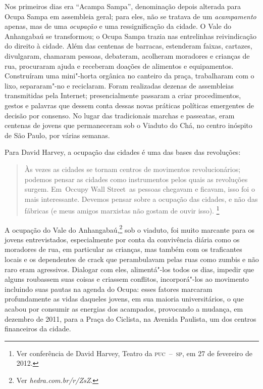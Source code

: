 Nos primeiros dias era ``Acampa Sampa'', denominação depois alterada
para Ocupa Sampa em assembleia geral; para eles, não se tratava de um
\textit{acampamento} apenas, mas de uma \textit{ocupação} e uma ressignificação da
cidade. O Vale do Anhangabaú se transformou; o Ocupa Sampa trazia nas
entrelinhas reivindicação do direito à cidade. Além das centenas de
barracas, estenderam faixas, cartazes, divulgaram, chamaram pessoas,
debateram, acolheram moradores e crianças de rua, procuraram ajuda e
receberam doações de alimentos e equipamentos. Construíram uma
mini"-horta orgânica no canteiro da praça, trabalharam com o lixo,
separaram"-no e reciclaram. Foram realizadas dezenas de assembleias
transmitidas pela Internet; presencialmente passaram a criar
procedimentos, gestos e palavras que dessem conta dessas novas práticas
políticas emergentes de decisão por consenso. No lugar das tradicionais
marchas e passeatas, eram centenas de jovens que permaneceram sob o
Viaduto do Chá, no centro inóspito de São Paulo, por várias semanas.

Para David Harvey, a ocupação das cidades é uma das bases das
revoluções:

\begin{quote}
Às vezes as cidades se tornam centros de movimentos revolucionários;
podemos pensar as cidades como instrumentos pelos quais as revoluções
surgem. Em~Occupy Wall Street~as pessoas chegavam e ficavam, isso foi o
mais interessante. Devemos pensar sobre a ocupação das cidades, e não
das fábricas (e meus amigos marxistas não gostam de ouvir isso).
\footnote{Ver conferência de David Harvey, Teatro da \textsc{puc~--~sp}, em 27 de fevereiro de 2012.} 
\end{quote}

A ocupação do Vale do Anhangabaú,\footnote{Ver
  \textit{hedra.com.br/r/ZsZ}.} sob o
viaduto, foi muito marcante para os jovens entrevistados,
especialmente por conta da convivência diária como os moradores de rua,
em particular as crianças, mas também com os traficantes locais e os
dependentes de crack que perambulavam pelas ruas como zumbis e não raro
eram agressivos. Dialogar com eles, alimentá"-los todos os dias, impedir
que alguns roubassem suas coisas e criassem conflitos, incorporá"-los ao
movimento incluindo suas pautas na agenda do Ocupa: esses fatores
marcaram profundamente as vidas daqueles jovens, em sua maioria
universitários, o que acabou por consumir as energias dos
acampados, provocando a mudança, em dezembro de 2011, para a Praça do
Ciclista, na Avenida Paulista, um dos centros financeiros da cidade.

